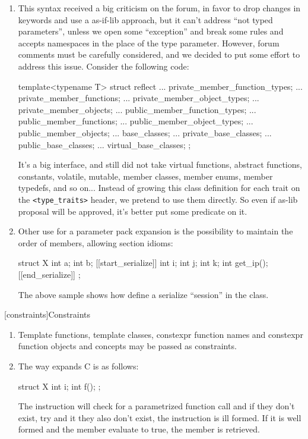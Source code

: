 \begin{enumerate}
\item This syntax received a big criticism on the forum, in favor to drop changes in keywords and use a as-if-lib approach, but it can't address ``not typed parameters'', unless we open some ``exception'' and break some rules and accepts namespaces in the place of the type parameter. However, forum comments must be carefully considered, and we decided to put some effort to address this issue. Consider the following code:
\begin{codeblock}
template<typename T>
struct reflect {
  ... private_member_function_types;
  ... private_member_functions;
  ... private_member_object_types;
  ... private_member_objects;
  ... public_member_function_types;
  ... public_member_functions;
  ... public_member_object_types;
  ... public_member_objects;
  ... base_classes;
  ... private_base_classes;
  ... public_base_classes;
  ... virtual_base_classes;
};
\end{codeblock}
It's a big interface, and still did not take virtual functions, abstract functions, constants, volatile, mutable, member classes, member enums, member typedefs, and so on... Instead of growing this class definition for each trait on the \texttt{<type_traits>} header, we pretend to use them directly. So even if as-lib proposal will be approved, it's better put some predicate on it.
\item Other use for a parameter pack expansion is the possibility to maintain the order of members, allowing section idioms:
\begin{codeblock}
struct X {
 int a;
 int b;
[[start_serialize]]
 int i;
 int j;
 int k;
 int get_ip(); 
[[end_serialize]]
};
\end{codeblock}
The above sample shows how define a serialize ``session'' in the class.
\end{enumerate}
[constraints]{Constraints}
\begin{enumerate}
\item Template functions, template classes, constexpr function names and constexpr function objects and concepts may be passed as constraints.
\item The way  expands C is as follows:
\begin{codeblock}
struct X {
 int i;
 int f(); 
};
\end{codeblock}
The instruction  will check for a parametrized function call  and  if they don't exist, try  and  it they also don't exist, the instruction is ill formed. If it is well formed and the member evaluate to true, the member is retrieved.
\end{enumerate}
